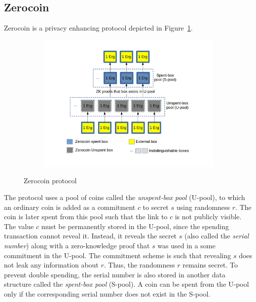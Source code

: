 \documentclass[runningheads]{llncs}
\newcommand{\zerocoin}{Zerocoin\xspace}
\begin{document}
\subsection{\zerocoin}
\label{zerocoin} 

\zerocoin is a privacy enhancing protocol depicted in Figure~\ref{fig:zerocoin}. 

\begin{figure}[h]
	\centering
	\begin{subfigure}{.7\textwidth}
		\centering
		\includegraphics[width=\linewidth]{Zerocoin.jpg}
	\end{subfigure}
	\caption{\zerocoin protocol}
	\label{fig:zerocoin}
\end{figure}

The protocol uses a pool of coins called the {\em unspent-box pool} (U-pool), to which an ordinary coin is added as a commitment $c$ to secret $s$ using randomness $r$. The coin is later spent from this pool such that the link to $c$ is not publicly visible. The value $c$ must be permanently stored in the U-pool, since the spending transaction cannot reveal it. Instead, it reveals the secret $s$ (also called the {\em serial number}) along with a zero-knowledge proof that $s$ was used in a some commitment in the U-pool. The commitment scheme is such that revealing $s$ does not leak any information about $r$. Thus, the randomness $r$ remains secret. 
To prevent double spending, the serial number is also stored in another data structure called the {\em spent-box pool} (S-pool). A coin can be spent from the U-pool only if the corresponding serial number does not exist in the S-pool. 
\end{document}
